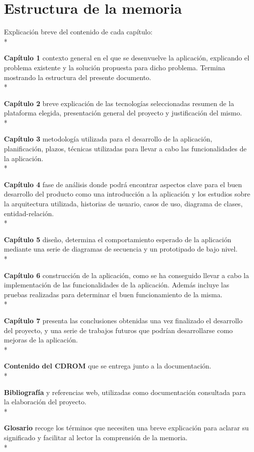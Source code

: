 \documentclass[../pfc.tex]{subfiles}
\begin{document}
\section{Estructura de la memoria}

Explicación breve del contenido de cada capítulo:\\*

  \textbf{Capítulo 1} contexto general en el que se desenvuelve la aplicación, explicando el problema existente y la solución propuesta para dicho problema. Termina mostrando la estructura del presente documento.\\*
  
  \textbf{Capítulo 2} breve explicación de las tecnologías seleccionadas resumen de la plataforma elegida, presentación general del proyecto y justificación del mismo.\\*
  
  \textbf{Capítulo 3} metodología utilizada para el desarrollo de la aplicación, planificación, plazos, técnicas utilizadas para llevar a cabo las funcionalidades de la aplicación.\\*
  
  \textbf{Capítulo 4} fase de análisis donde podrá encontrar aspectos clave para el buen desarrollo del producto como una introducción a la aplicación y los estudios sobre la arquitectura utilizada, historias de usuario, casos de uso, diagrama de clases, entidad-relación.\\*
  
  \textbf{Capítulo 5} diseño, determina el comportamiento esperado de la aplicación mediante una serie de diagramas de secuencia y un prototipado de bajo nivel.\\*
  
  \textbf{Capítulo 6} construcción de la aplicación, como se ha conseguido llevar a cabo la implementación de las funcionalidades de la aplicación. Además incluye las pruebas realizadas para determinar el buen funcionamiento de la misma.\\*
  
  \textbf{Capítulo 7} presenta las conclusiones obtenidas una vez finalizado el desarrollo del proyecto, y una serie de trabajos futuros que podrían desarrollarse como mejoras de la aplicación.\\*
  
  \textbf{Contenido del CDROM} que se entrega junto a la documentación.\\* 
  
  \textbf{Bibliografía} y referencias web, utilizadas como documentación consultada para la elaboración del proyecto.\\*
  
  \textbf{Glosario} recoge los términos que necesiten una breve explicación para aclarar su significado y facilitar al lector la comprensión de la memoria.\\* 
   
 
\end{document}
